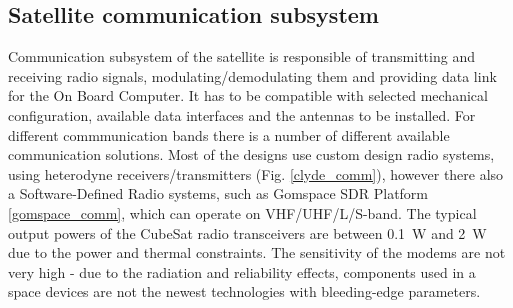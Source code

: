 \subsection{Satellite communication subsystem}
Communication subsystem of the satellite is responsible of transmitting and receiving radio signals, modulating/demodulating them and providing data link for the On Board Computer. It has to be compatible with selected mechanical configuration, available data interfaces and the antennas to be installed. For different commmunication bands there is a number of different available communication solutions. Most of the designs use custom design radio systems, using heterodyne receivers/transmitters (Fig. \ref{clyde_comm}), however there also a Software-Defined Radio systems, such as Gomspace SDR Platform \ref{gomspace_comm}, which can operate on VHF/UHF/L/S-band. The typical output powers of the CubeSat radio transceivers are between \SI{0.1}{\watt} and \SI{2}{\watt} due to the power and thermal constraints. The sensitivity of the modems are not very high - due to the radiation and reliability effects, components used in a space devices are not the newest technologies with bleeding-edge parameters.

